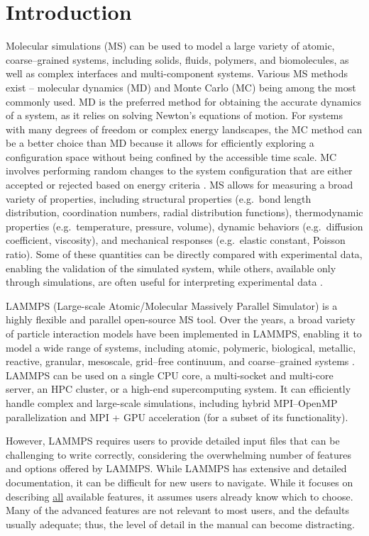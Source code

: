 \documentclass[9pt,tutorial]{livecoms}
\renewcommand{\emph}[1]{\underline{#1}} %
\begin{document}
\section{Introduction}

Molecular simulations (MS) can be used to model a large variety of
atomic, coarse--grained systems, including solids, fluids, polymers, and
biomolecules, as well as complex interfaces and multi-component systems.
Various MS methods exist -- molecular dynamics (MD) and Monte Carlo (MC)
being among the most commonly used.  MD is the preferred method for
obtaining the accurate dynamics of a system, as it relies on solving
Newton's equations of motion.  For systems with many degrees of freedom
or complex energy landscapes, the MC method can be a better choice than
MD because it allows for efficiently exploring a configuration space
without being confined by the accessible time scale.  MC involves
performing random changes to the system configuration that are either
accepted or rejected based on energy criteria
\cite{frenkel2023understanding, allen2017computer}.  MS allows for
measuring a broad variety of properties, including structural properties
(e.g.~bond length distribution, coordination numbers, radial
distribution functions), thermodynamic properties (e.g.~temperature,
pressure, volume), dynamic behaviors (e.g.~diffusion coefficient,
viscosity), and mechanical responses (e.g.~elastic constant, Poisson
ratio).  Some of these quantities can be directly compared with
experimental data, enabling the validation of the simulated system,
while others, available only through simulations, are often useful for
interpreting experimental data \cite{van2008molecular}.

LAMMPS (Large-scale Atomic/Molecular Massively Parallel Simulator)
\cite{lammps_home} is a highly flexible and parallel open-source MS
tool.  Over the years, a broad variety of particle interaction models
have been implemented in LAMMPS, enabling it to model a wide range of
systems, including atomic, polymeric, biological, metallic, reactive, granular,
mesoscale, grid--free continuum, and coarse--grained systems
\cite{thompson2022lammps}.  LAMMPS can be used on a single CPU core, a
multi-socket and multi-core server, an HPC cluster, or a high-end
supercomputing system.  It can efficiently handle complex and large-scale
simulations, including hybrid MPI--OpenMP parallelization
and MPI + GPU acceleration (for a subset of its functionality).

However, LAMMPS requires users to provide detailed input files that can
be challenging to write correctly, considering the overwhelming number
of features and options offered by LAMMPS.  While LAMMPS has
extensive and detailed documentation, it can be difficult for new users
to navigate.  While it focuses on describing \emph{all} available
features, it assumes users already know which to choose.  Many of
the advanced features are not relevant to most users, and the defaults
usually adequate; thus, the level of detail in the manual can become
distracting.
\end{document}
